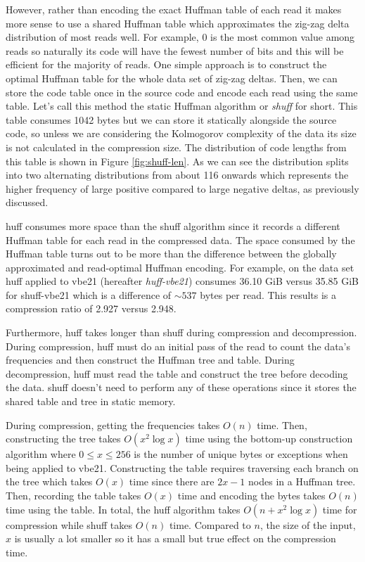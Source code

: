 However, rather than encoding the exact Huffman table of each read it makes more
sense to use a shared Huffman table which approximates the zig-zag delta
distribution of most reads well.
For example, 0 is the most common value among reads so naturally its code will
have the fewest number of bits and this will be efficient for the majority of
reads. One simple approach is to construct the optimal Huffman table for the
whole data set of zig-zag deltas. Then, we can store the code table once in the
source code and encode each read using the same table. Let's call this method
the static Huffman algorithm or \textit{shuff} for short. This table consumes
1042 bytes but we can store it statically alongside the source code, so unless
we are considering the Kolmogorov complexity of the data its size is not
calculated in the compression size. The distribution of code lengths from this
table is shown in Figure \ref{fig:shuff-len}. As we can see the distribution
splits into two alternating distributions from about 116 onwards which
represents the higher frequency of large positive compared to large negative
deltas, as previously discussed.

huff consumes more space than the shuff algorithm since it records a different
Huffman table for each read in the compressed data. The space consumed by the
Huffman table turns out to be more than the difference between the globally
approximated and read-optimal Huffman encoding. For example, on the data set
huff applied to vbe21 (hereafter \textit{huff-vbe21}) consumes 36.10 GiB versus
35.85 GiB for shuff-vbe21 which is a difference of $\sim537$ bytes per read.
This results is a compression ratio of 2.927 versus 2.948.

Furthermore, huff takes longer than shuff during compression and decompression.
During compression, huff must do an initial pass of the read to count the data's
frequencies and then construct the Huffman tree and table.  During
decompression, huff must read the table and construct the tree before decoding
the data.  shuff doesn't need to perform any of these operations since it stores
the shared table and tree in static memory.

During compression, getting the frequencies takes $O(n)$ time. Then,
constructing the tree takes $O(x^2\log x)$ time using the bottom-up construction
algorithm where $0\le x \le 256$ is the number of unique bytes or exceptions
when being applied to vbe21. Constructing the table requires traversing each
branch on the tree which takes $O(x)$ time since there are $2x-1$ nodes in a
Huffman tree. Then, recording the table takes $O(x)$ time and encoding the bytes
takes $O(n)$ time using the table. In total, the huff algorithm takes
$O(n + x^2\log x)$ time for compression while shuff takes $O(n)$ time. Compared
to $n$, the size of the input, $x$ is usually a lot smaller so it has a small
but true effect on the compression time.

